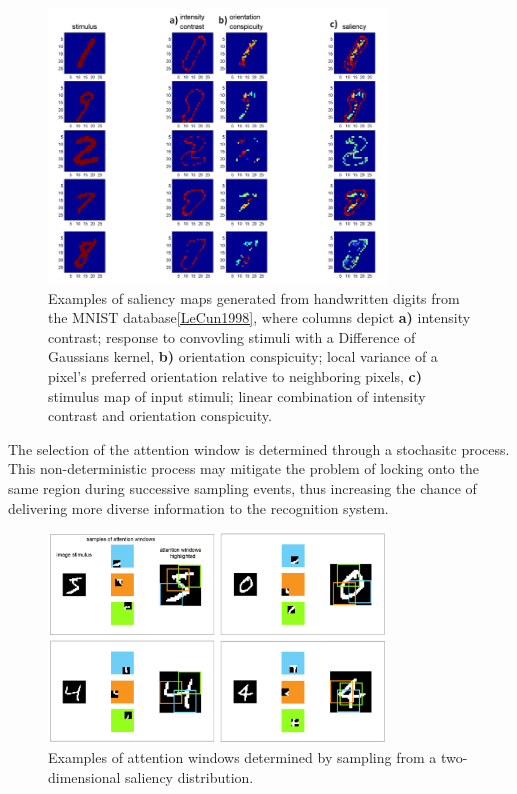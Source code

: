 \documentclass{report}
\begin{document}
\begin{figure}[ht]
\centering
\includegraphics[width=0.8\textwidth]{saliency_examples}
\caption{Examples of saliency maps generated from handwritten digits from the MNIST database\cref{LeCun1998}, where columns depict \textbf{a)} intensity contrast; response to convovling stimuli with a Difference of Gaussians kernel, \textbf{b)} orientation conspicuity; local variance of a pixel's preferred orientation relative to neighboring pixels, \textbf{c)} stimulus map of input stimuli; linear combination of intensity contrast and orientation conspicuity.
\label{fig:saliency_examples}}
\end{figure}

The selection of the attention window is determined through a stochasitc process. This non-deterministic process may mitigate the problem of locking onto the same region during successive sampling events, thus increasing the chance of delivering more diverse information to the recognition system. 

\begin{figure}[ht]
\centering
\includegraphics[width=0.8\textwidth]{attention_windows_examples}
\caption{Examples of attention windows determined by sampling from a two-dimensional saliency distribution.
\label{fig:attention_windows_examples}}
\end{figure}
\end{document}
